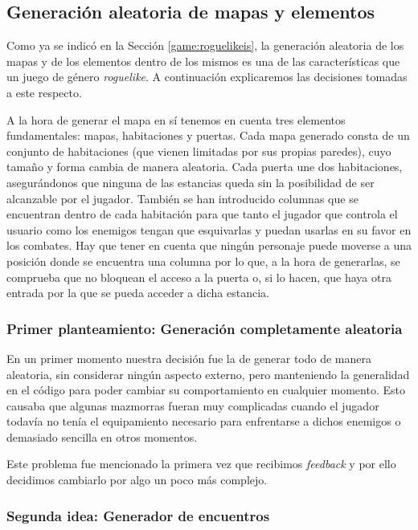\subsection{Generación aleatoria de mapas y elementos}

Como ya se indicó en la Sección \ref{game:roguelikeis}, la generación aleatoria de los mapas y de los elementos dentro de los mismos es una de las características que un juego de género \textit{roguelike}. A continuación explicaremos las decisiones tomadas a este respecto.

A la hora de generar el mapa en sí tenemos en cuenta tres elementos fundamentales: mapas, habitaciones y puertas. Cada mapa generado consta de un conjunto de habitaciones (que vienen limitadas por sus propias paredes), cuyo tamaño y forma cambia de manera aleatoria. Cada puerta une dos habitaciones, asegurándonos que ninguna de las estancias queda sin la posibilidad de ser alcanzable por el jugador. También se han introducido columnas que se encuentran dentro de cada habitación para que tanto el jugador que controla el usuario como los enemigos tengan que esquivarlas y puedan usarlas en su favor en los combates. Hay que tener en cuenta que ningún personaje puede moverse a una posición donde se encuentra una columna por lo que, a la hora de generarlas, se comprueba que no bloquean el acceso a la puerta o, si lo hacen, que haya otra entrada por la que se pueda acceder a dicha estancia.

\subsubsection{Primer planteamiento: Generación completamente aleatoria}

En un primer momento nuestra decisión fue la de generar todo de manera aleatoria, sin considerar ningún aspecto externo, pero manteniendo la generalidad en el código para poder cambiar su comportamiento en cualquier momento. Esto causaba que algunas mazmorras fueran muy complicadas cuando el jugador todavía no tenía el equipamiento necesario para enfrentarse a dichos enemigos o demasiado sencilla en otros momentos.

Este problema fue mencionado la primera vez que recibimos \textit{feedback} y por ello decidimos cambiarlo por algo un poco más complejo.

\subsubsection{Segunda idea: Generador de encuentros}
\label{generadorencuentros}

